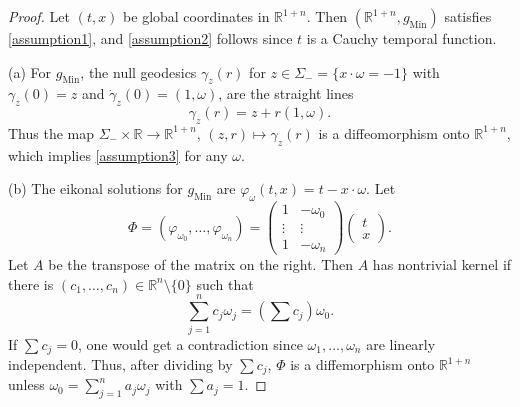 \documentclass[11pt,letterpaper]{amsart}
\theoremstyle{definition}
\numberwithin{equation}{section}
\newcommand{\mR}{\mathbb{R}}                    %
\newcommand{\gm}{g_{\mathrm{Min}}}
\begin{document}
\begin{proof}
Let $(t,x)$ be global coordinates in $\mR^{1+n}$. Then $(\mR^{1+n}, \gm)$ satisfies \eqref{assumption1}, and \eqref{assumption2} follows since $t$ is a Cauchy temporal function.

(a) For $\gm$, the null geodesics $\gamma_z(r)$ for $z \in \Sigma_- = \{ x \cdot \omega = -1 \}$ with $\gamma_z(0) = z$ and $\dot{\gamma}_z(0) = (1,\omega)$, are the straight lines 
\[
\gamma_z(r) = z + r(1,\omega).
\]
Thus the map $\Sigma_- \times \mR \to \mR^{1+n}$, $(z,r) \mapsto \gamma_z(r)$ is a diffeomorphism onto $\mR^{1+n}$, which implies \eqref{assumption3} for any $\omega$. 

(b) The eikonal solutions for $\gm$ are $\varphi_{\omega}(t,x) = t - x \cdot \omega$. Let 
\[
\Phi = (\varphi_{\omega_0}, \ldots, \varphi_{\omega_n}) = \left( \begin{array}{rc} 1 & -\omega_0 \\ \vdots & \vdots \\ 1 & -\omega_n \end{array} \right) \begin{pmatrix} t \\ x \end{pmatrix}.
\]
Let $A$ be the transpose of the matrix on the right. Then $A$ has nontrivial kernel if there is $(c_1, \ldots, c_n) \in \mR^n \setminus \{0\}$ such that 
\[
\sum_{j=1}^n c_j \omega_j = (\sum c_j) \omega_0.
\]
If $\sum c_j = 0$, one would get a contradiction since $\omega_1, \ldots, \omega_n$ are linearly independent. Thus, after dividing by $\sum c_j$, $\Phi$ is a diffemorphism onto $\mR^{1+n}$ unless $\omega_0 = \sum_{j=1}^n a_j \omega_j$ with $\sum a_j = 1$.


\end{proof}
\end{document}
